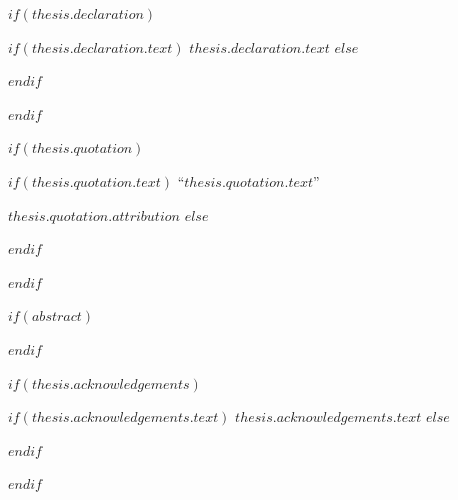$if(thesis.declaration)$
\begin{declaration}
\addchaptertocentry{\authorshipname} %
$if(thesis.declaration.text)$
$thesis.declaration.text$
$else$

$endif$

\end{declaration}

\cleardoublepage
$endif$

$if(thesis.quotation)$

\vspace*{0.2\textheight}

$if(thesis.quotation.text)$
\noindent``{\itshape $thesis.quotation.text$}''\bigbreak

\hfill $thesis.quotation.attribution$
$else$

$endif$

$endif$

$if(abstract)$

\begin{abstract}
\addchaptertocentry{\abstractname} %
$abstract$
\end{abstract}

$endif$

$if(thesis.acknowledgements)$

\begin{acknowledgements}
\addchaptertocentry{\acknowledgementname} %
$if(thesis.acknowledgements.text)$
$thesis.acknowledgements.text$
$else$

$endif$
\end{acknowledgements}

$endif$


